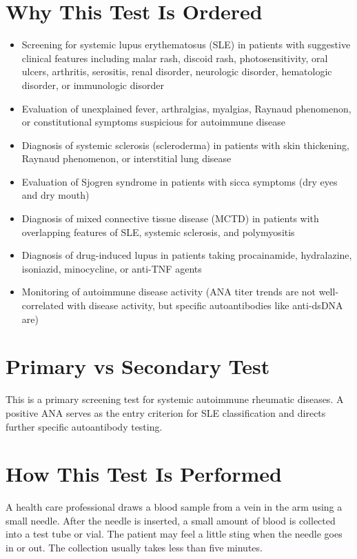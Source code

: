 \section*{Why This Test Is Ordered}
\begin{itemize}
  \item Screening for systemic lupus erythematosus (SLE) in patients with suggestive clinical features including malar rash, discoid rash, photosensitivity, oral ulcers, arthritis, serositis, renal disorder, neurologic disorder, hematologic disorder, or immunologic disorder
  \item Evaluation of unexplained fever, arthralgias, myalgias, Raynaud phenomenon, or constitutional symptoms suspicious for autoimmune disease
  \item Diagnosis of systemic sclerosis (scleroderma) in patients with skin thickening, Raynaud phenomenon, or interstitial lung disease
  \item Evaluation of Sjogren syndrome in patients with sicca symptoms (dry eyes and dry mouth)
  \item Diagnosis of mixed connective tissue disease (MCTD) in patients with overlapping features of SLE, systemic sclerosis, and polymyositis
  \item Diagnosis of drug-induced lupus in patients taking procainamide, hydralazine, isoniazid, minocycline, or anti-TNF agents
  \item Monitoring of autoimmune disease activity (ANA titer trends are not well-correlated with disease activity, but specific autoantibodies like anti-dsDNA are)
\end{itemize}

\section*{Primary vs Secondary Test}
This is a primary screening test for systemic autoimmune rheumatic diseases. A positive ANA serves as the entry criterion for SLE classification and directs further specific autoantibody testing.

\section*{How This Test Is Performed}
A health care professional draws a blood sample from a vein in the arm using a small needle. After the needle is inserted, a small amount of blood is collected into a test tube or vial. The patient may feel a little sting when the needle goes in or out. The collection usually takes less than five minutes.

